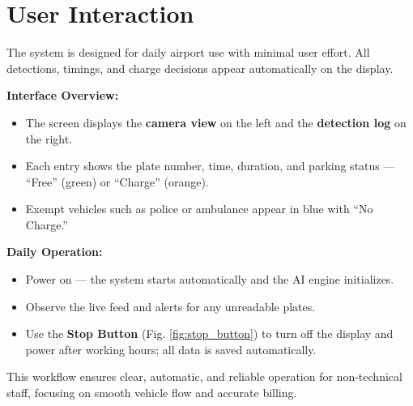 \section{User Interaction}
The system is designed for daily airport use with minimal user effort. All detections, timings, and charge decisions appear automatically on the display.

\vspace{0.6em}
\noindent\textbf{Interface Overview:}
\begin{itemize}
	\item The screen displays the \textbf{camera view} on the left and the \textbf{detection log} on the right.
	\item Each entry shows the plate number, time, duration, and parking status — “Free” (green) or “Charge” (orange).
	\item Exempt vehicles such as police or ambulance appear in blue with “No Charge.”
\end{itemize}

\vspace{0.6em}
\noindent\textbf{Daily Operation:}
\begin{itemize}
	\item Power on — the system starts automatically and the AI engine initializes.
	\item Observe the live feed and alerts for any unreadable plates.
	\item Use the \textbf{Stop Button} (Fig. \ref{fig:stop_button}) to turn off the display and power after working hours; all data is saved automatically.
\end{itemize}

\vspace{0.4cm}
\noindent
This workflow ensures clear, automatic, and reliable operation for non-technical staff, focusing on smooth vehicle flow and accurate billing.